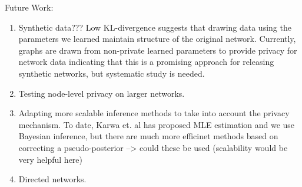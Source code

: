 Future Work:
\begin{enumerate}
	\item Synthetic data??? Low KL-divergence suggests that drawing data using the parameters we learned maintain structure of the original network. Currently, graphs are drawn from non-private learned parameters to provide privacy for network data indicating that this is a promising approach for releasing synthetic networks, but systematic study is needed.
	\item Testing node-level privacy on larger networks.
	\item Adapting more scalable inference methods to take into account the privacy mechanism. To date, Karwa et. al has proposed MLE estimation and we use Bayesian inference, but there are much more efficinet methods based on correcting a pseudo-posterior --> could these be used (scalability would be very helpful here) 
	\item Directed networks.
\end{enumerate}
